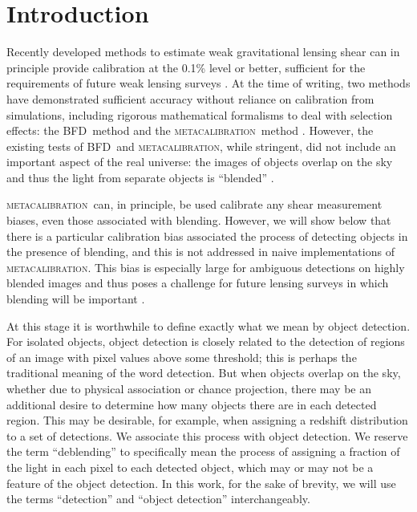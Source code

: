 \documentclass[iop, twocolappendix, appendixfloats, numberedappendix, apj]{hackemulateapj}
\newcommand{\mcal}{\textsc{metacalibration}}
\newcommand{\bfd}{\textsc{BFD}}
\begin{document}
\section{Introduction}

Recently developed methods to estimate weak gravitational lensing shear can in
principle provide calibration at the 0.1\% level or better, sufficient for the
requirements of future weak lensing surveys \citep[e.g.,][]{huterer2006}.  At
the time of writing, two methods have demonstrated sufficient accuracy without
reliance on calibration from simulations, including rigorous mathematical
formalisms to deal with selection effects:  the \bfd\ method
\citep{BernBFD2016} and the \mcal\ method \citep{HuffMcal2017,SheldonMcal2017}.
However, the existing tests of \bfd\ and \mcal, while stringent, did not
include an important aspect of the real universe: the images of objects overlap
on the sky and thus the light from separate objects is ``blended'' \citep[for
discussion of blending effects see, e.g.,][]{DawsonBlending2016}.

\mcal\ can, in principle, be used calibrate any shear measurement biases, even
those associated with blending.  However, we will show below that there is a
particular calibration bias associated the process of detecting objects in the
presence of blending, and this is not addressed in naive implementations of
\mcal. This bias is especially large for ambiguous detections on highly blended
images and thus poses a challenge for future lensing surveys in which
blending will be important \citep{DawsonBlending2016}.

At this stage it is worthwhile to define exactly what we mean by object
detection.  For isolated objects, object detection is closely related to the
detection of regions of an image with pixel values above some threshold; this
is perhaps the traditional meaning of the word detection. But when objects
overlap on the sky, whether due to physical association or chance projection,
there may be an additional desire to determine how many objects there are in
each detected region. This may be desirable, for example, when assigning a
redshift distribution to a set of detections.  We associate this process with
object detection.  We reserve the term ``deblending'' to specifically mean the
process of assigning a fraction of the light in each pixel to each detected
object, which may or may not be a feature of the object detection.  In this
work, for the sake of brevity, we will use the terms ``detection'' and ``object
detection'' interchangeably.
\end{document}
